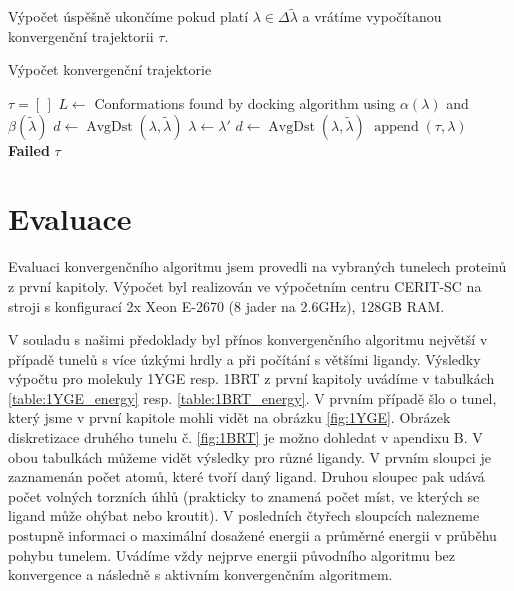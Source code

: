 Výpočet úspěšně ukončíme pokud platí $\lambda \in \Delta\tilde{\lambda}$ a
vrátíme vypočítanou konvergenční trajektorii $ \tau $.

\begin{algorithm}[ht]
\caption{Výpočet konvergenční trajektorie}
\label{alg:convergence}
\begin{algorithmic}[1]

    \State $ \tau = [\,] $
    \While {$\lambda \not\in \Delta\tilde{\lambda}$}
        \State $ L \gets $ Conformations found by docking algorithm using $ \alpha(\lambda) $
            and $ \beta(\tilde{\lambda})$ \label{alg:convergence:docking}
        \State $ d \gets \operatorname{AvgDst}(\lambda, \tilde{\lambda}) $
             \label{alg:convergence:feasibility}
                 \label{alg:convergence:best}
                    \State $ \lambda \gets \lambda' $
                \EndIf
            \EndIf
        \EndFor
         \label{alg:convergence:progress}
            \State $d \gets \operatorname{AvgDst}(\lambda, \tilde{\lambda}) $
            \State $ \operatorname{append}(\tau, \lambda) $
        \Else
            \State \Return \textbf{Failed}
        \EndIf
    \EndWhile
    \State \Return $\tau$
\EndFunction


\end{algorithmic}
\end{algorithm}




\clearpage
\section{Evaluace} \label{subsec:convergence_evaluation}
Evaluaci konvergenčního algoritmu jsem provedli na vybraných tunelech proteinů
z první kapitoly. Výpočet byl realizován ve výpočetním centru CERIT-SC na
stroji s konfigurací 2x Xeon E-2670 (8 jader na 2.6GHz), 128GB RAM.

V souladu s našimi předoklady byl přínos konvergenčního algoritmu největší
v případě tunelů s více úzkými hrdly a při počítání s většími ligandy. Výsledky
výpočtu pro molekuly 1YGE resp. 1BRT z první kapitoly uvádíme v tabulkách
\ref{table:1YGE_energy} resp. \ref{table:1BRT_energy}. V prvním případě šlo
o tunel, který jsme v první kapitole mohli vidět na obrázku \ref{fig:1YGE}.
Obrázek diskretizace druhého tunelu č. \ref{fig:1BRT} je možno dohledat v apendixu B.
V obou tabulkách můžeme vidět výsledky pro různé ligandy. V prvním sloupci
je zaznamenán počet atomů, které tvoří daný ligand. Druhou sloupec pak udává
počet volných torzních úhlů (prakticky to znamená počet míst, ve kterých
se ligand může ohýbat nebo kroutit). V posledních čtyřech sloupcích nalezneme
postupně informaci o maximální dosažené energii a průměrné energii v průběhu
pohybu tunelem. Uvádíme vždy nejprve energii původního algoritmu bez konvergence
a následně s aktivním konvergenčním algoritmem.


